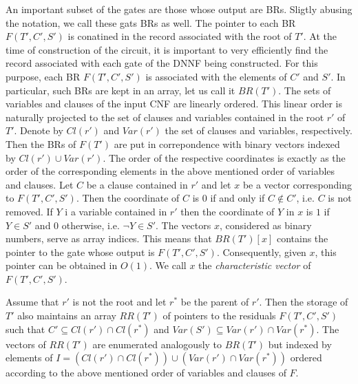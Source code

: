 \documentclass{llncs}
\begin{document}
An important subset of the gates are those whose output are BRs. 
Sligtly abusing the notation, we call these gats BRs as well. 
The pointer to each BR $F(T',C',S')$ is conatined in the
record associated with the root of $T'$. At the time of construction of the circuit, it is important to very efficiently
find the record associated with each gate of the DNNF being constructed. For this purpose, each BR $F(T',C',S')$
is associated with the elements of $C'$ and $S'$. In particular, such BRs are kept in an array, let us call it $BR(T')$.
The sets of variables and clauses of the input CNF are linearly ordered. This linear order is naturally projected to the
set of clauses and variables contained in the root $r'$ of $T'$. Denote by $Cl(r')$ and $Var(r')$ the set of clauses
and variables, respectively. Then the BRs  of $F(T')$ are put in correpondence with binary vectors indexed by $Cl(r') \cup Var(r')$.
The order of the respective coordinates is exactly as the order of the corresponding elements in the above mentioned order
of variables and clauses. Let $C$ be a clause contained in $r'$ and let $x$ be a vector corresponding to $F(T',C',S')$.
Then the coordinate of $C$ is $0$ if and only if $C \notin C'$, i.e. $C$ is not removed. If $Y$ i a variable contained in $r'$
then the coordinate of $Y$ in $x$ is $1$ if $Y \in S'$ and $0$ otherwise, i.e. $\neg Y \in S'$. The vectors $x$, considered
as binary numbers, serve as array indices. This means that $BR(T')[x]$  contains the pointer to the gate whose output 
is $F(T',C',S')$. Consequently, given $x$, this pointer can be obtained in  $O(1)$. We call $x$ the \emph{characteristic vector}
of $F(T',C',S')$.

Assume that $r'$ is not the root and let $r^*$ be the parent of $r'$. Then the storage of $T'$ also maintains 
an array $RR(T')$ of pointers to the residuals $F(T',C',S')$ such that $C' \subseteq Cl(r') \cap Cl(r^*)$ and
$Var(S') \subseteq Var(r') \cap Var(r^*)$. The vectors of $RR(T')$ are enumerated analogously to $BR(T')$
but indexed by elements of $I=(Cl(r') \cap Cl(r^*)) \cup (Var(r') \cap Var(r^*))$ ordered according to the above
mentioned order of variables and clauses of $F$.
\end{document}
